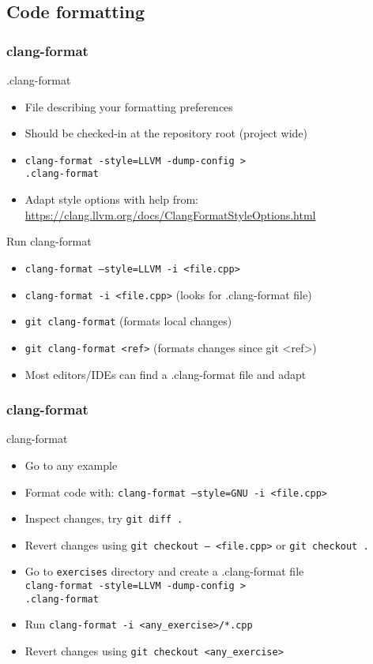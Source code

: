 \subsection[format]{Code formatting}

\begin{frame}[fragile]
\frametitle{clang-format}
\begin{block}{.clang-format}
	\begin{itemize}
		\item File describing your formatting preferences
		\item Should be checked-in at the repository root (project wide)
		\item \texttt{clang-format -style=LLVM -dump-config >} \\
		  \texttt{.clang-format}
		\item Adapt style options with help from: \url{https://clang.llvm.org/docs/ClangFormatStyleOptions.html}
	\end{itemize}
\end{block}
\begin{block}{Run clang-format}
	\begin{itemize}
		\item \texttt{clang-format --style=LLVM -i <file.cpp>}
		\item \texttt{clang-format -i <file.cpp>} (looks for .clang-format file)
		\item \texttt{git clang-format} (formats local changes)
		\item \texttt{git clang-format <ref>} (formats changes since git \textless{}ref\textgreater{})
		\item Most editors/IDEs can find a .clang-format file and adapt
	\end{itemize}
\end{block}
\end{frame}

\begin{frame}[fragile]
\frametitle{clang-format}
\begin{exercise}{clang-format}
	\begin{itemize}
		\item Go to any example
		\item Format code with: \texttt{clang-format --style=GNU -i <file.cpp>}
		\item Inspect changes, try \texttt{git diff .}
		\item Revert changes using \texttt{git checkout -- <file.cpp>} or \texttt{git checkout .}
		\item Go to \texttt{exercises} directory and create a .clang-format file \\
		  \texttt{clang-format -style=LLVM -dump-config >} \\
		  \texttt{.clang-format}
		\item Run \texttt{clang-format -i <any_exercise>/*.cpp}
		\item Revert changes using \texttt{git checkout <any_exercise>}
	\end{itemize}
\end{exercise}
\end{frame}
